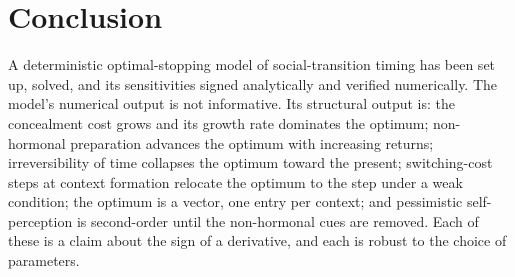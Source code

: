 \documentclass[11pt,a4paper]{article}
\theoremstyle{remark}
\begin{document}
\section{Conclusion}
\label{sec:conclusion}

A deterministic optimal-stopping model of social-transition timing has been set up, solved, and its sensitivities signed analytically and verified numerically. The model's numerical output is not informative. Its structural output is: the concealment cost grows and its growth rate dominates the optimum; non-hormonal preparation advances the optimum with increasing returns; irreversibility of time collapses the optimum toward the present; switching-cost steps at context formation relocate the optimum to the step under a weak condition; the optimum is a vector, one entry per context; and pessimistic self-perception is second-order until the non-hormonal cues are removed. Each of these is a claim about the sign of a derivative, and each is robust to the choice of parameters.
\end{document}
